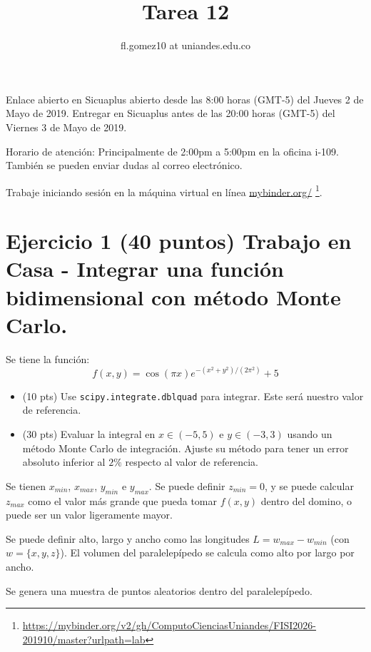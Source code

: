 \documentclass{article}
\title{Tarea 12}
\author{fl.gomez10 at uniandes.edu.co}
\begin{document}
\maketitle

Enlace abierto en Sicuaplus abierto desde las 8:00 horas (GMT-5) del Jueves 2 de Mayo de 2019.
Entregar en Sicuaplus antes de las 20:00 horas (GMT-5) del Viernes 3 de Mayo de 2019. 

Horario de atención: Principalmente de 2:00pm a 5:00pm en la oficina i-109.
También se pueden enviar dudas al correo electrónico.


Trabaje iniciando  sesión en la máquina virtual en línea
\href{https://mybinder.org/v2/gh/ComputoCienciasUniandes/FISI2026-201910/master?urlpath=lab}{mybinder.org/}
\footnote{\url{https://mybinder.org/v2/gh/ComputoCienciasUniandes/FISI2026-201910/master?urlpath=lab}}. 


\section{Ejercicio 1 (40 puntos) Trabajo en Casa - Integrar una función bidimensional con método Monte Carlo.}

Se tiene la función:
\begin{equation}
  f(x,y) = \cos\left(\pi x \right) e^{-(x^2 + y^2)/(2\pi^2)} + 5
\end{equation}

\begin{itemize}
\item (10 pts) Use \texttt{scipy.integrate.dblquad} para integrar. Este será nuestro valor de referencia.
\item (30 pts) Evaluar la integral en $x \in(-5,5)$ e $y \in (-3,3)$ usando un método Monte Carlo de integración.
  Ajuste su método para tener un error absoluto inferior al $2\%$ respecto al valor de referencia.
\end{itemize}

Se tienen  $x_{min}$, $x_{max}$, $y_{min}$ e $y_{max}$. Se puede definir $z_{min}=0$, y se puede
calcular $z_{max}$ como el valor más grande que pueda tomar $f(x,y)$ dentro del domino, o puede
ser un valor ligeramente mayor.

Se puede definir alto, largo y ancho como las longitudes $L = w_{max} - w_{min}$ (con $w=\{x,y,z\}$).
El volumen del paralelepípedo se calcula como alto por largo por ancho.

Se genera una muestra de puntos aleatorios dentro del paralelepípedo.
\end{document}
